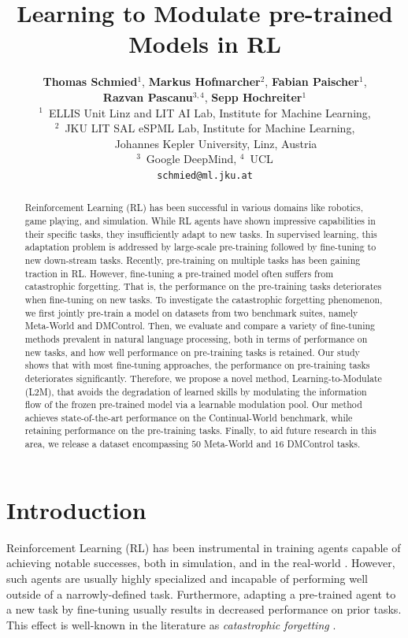 \documentclass{article}
\title{Learning to Modulate pre-trained Models in RL}
\author{
\hspace{-0.67cm}
  \textbf{Thomas Schmied}$^{1}$,
  \textbf{Markus Hofmarcher}$^{2}$,
  \textbf{Fabian Paischer}$^{1}$,\\
  \textbf{Razvan Pascanu}$^{3,4}$,
  \textbf{Sepp Hochreiter}$^{1}$ \\
\hspace{-0.67cm}
  $^{1}$~ELLIS Unit Linz and LIT AI Lab, Institute for Machine Learning,\\
\hspace{-0.67cm}
  $^{2}$~JKU LIT SAL eSPML Lab, Institute for Machine Learning,\\
\hspace{-0.67cm}
                  ~~~~Johannes Kepler University, Linz, Austria\\
\hspace{-0.67cm}
  $^{3}$~Google DeepMind, $^{4}$~UCL\\
\hspace{-0.67cm}
  \texttt{schmied@ml.jku.at}
}
\begin{document}
\maketitle



\begin{abstract}
Reinforcement Learning (RL) has been successful in various domains like robotics, game playing, and simulation.
While RL agents have shown impressive capabilities in their specific tasks, they insufficiently adapt to new tasks.
In supervised learning, this adaptation problem is addressed by large-scale pre-training followed by fine-tuning to new down-stream tasks.
Recently, pre-training on multiple tasks has been gaining traction in RL.
However, fine-tuning a pre-trained model often suffers from catastrophic forgetting.
That is, the performance on the pre-training tasks deteriorates when fine-tuning on new tasks.
To investigate the catastrophic forgetting phenomenon, we first jointly pre-train a model on datasets from two benchmark suites, namely Meta-World and DMControl.
Then, we evaluate and compare a variety of fine-tuning methods prevalent in natural language processing, both in terms of performance on new tasks, and how well performance on pre-training tasks is retained.
Our study shows that with most fine-tuning approaches, the performance on pre-training tasks deteriorates significantly.
Therefore, we propose a novel method, Learning-to-Modulate (L2M), that avoids the degradation of learned skills by modulating the information flow of the frozen pre-trained model via a learnable modulation pool. 
Our method achieves state-of-the-art performance on the Continual-World benchmark, while retaining performance on the pre-training tasks.
Finally, to aid future research in this area, we release a dataset encompassing $50$ Meta-World and $16$ DMControl tasks.
\end{abstract}

\section{Introduction}
Reinforcement Learning (RL) has been instrumental in training agents capable of achieving notable successes, both in simulation, and in the real-world \citep{Silver:16, Vinyals:19,Berner:19,Arjona:19,Bellemare:20,Degrave:2022}. 
However, such agents are usually highly specialized and incapable of performing well outside of a narrowly-defined task.
Furthermore, adapting a pre-trained agent to a new task by fine-tuning usually results in decreased performance on prior tasks.
This effect is well-known in the literature as \textit{catastrophic forgetting} \citep{McCloskey:1989}.
\end{document}
